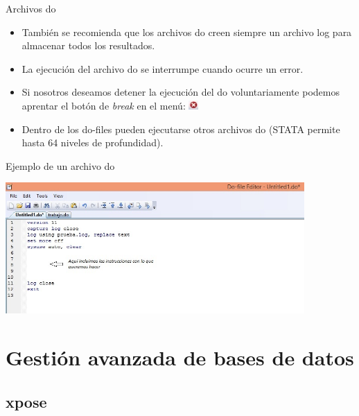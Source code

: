 \documentclass{beamer}
\begin{document}
\begin{frame}[allowframebreaks]{Archivos do}
\begin{itemize}
\item También se recomienda que los archivos do creen siempre un archivo log para almacenar todos los resultados. 
\item La ejecución del archivo do se interrumpe cuando ocurre un error.
\item Si nosotros deseamos detener la ejecución del do voluntariamente podemos aprentar el botón de \textit{break} en el menú: \includegraphics[height=0.35cm]{break.jpg}
\item Dentro de los do-files pueden ejecutarse otros archivos do (STATA permite hasta 64 niveles de profundidad).
\end{itemize}
\end{frame}

\begin{frame}{Ejemplo de un archivo do}
\centerline{\includegraphics[height=5cm]{do.jpg}}
\end{frame}

\section{Gestión avanzada de bases de datos}
\subsection{xpose}
\end{document}
